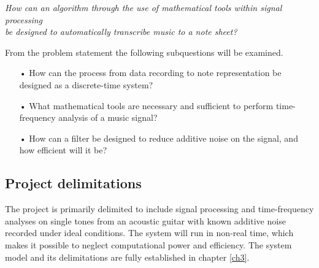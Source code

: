 \begin{center}
\textit{How can an algorithm through the use of mathematical tools within signal processing  \\
be designed to automatically transcribe music to a note sheet?}
\end{center}

From the problem statement the following subquestions will be examined.
\begin{itemize}
\item[•] How can the process from data recording to note representation be designed as a discrete-time system?
\item[•] What mathematical tools are necessary and sufficient to perform time-frequency analysis of a music signal?  
\item[•] How can a filter be designed to reduce additive noise on the signal, and how efficient will it be? 
\end{itemize}

\subsection{Project delimitations}
The project is primarily delimited to include signal processing and time-frequency analyses on single tones from an acoustic guitar with known additive noise recorded under ideal conditions. The system will run in non-real time, which makes it possible to neglect computational power and efficiency. The system model and its delimitations are fully established in chapter \ref{ch3}.


